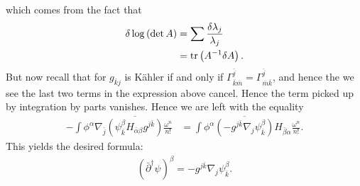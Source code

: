 \documentclass{../mathnotes}
\begin{document}
which comes from the fact that
\begin{align*}
    \delta\log\left( \det A \right)&=\sum\frac{\delta \lambda_j}{\lambda_j}\\
    &=\operatorname{tr}\left( A^{-1}\delta A \right).
\end{align*}
But now recall that for $g_{\bar kj}$ is K\"ahler if and only if $\Gamma^{\bar j}_{\bar k\bar m}=\Gamma^{\bar j}_{\bar m\bar k}$,
and hence the we see the last two terms in  the expression above cancel. Hence the term picked up by integration by parts vanishes.
Hence we are left with the equality
\begin{align*}
    -\int\phi^\alpha\nabla_{\bar j}\overline{\left( \psi^{\beta}_{\bar k}H_{\bar\alpha\beta}g^{j\bar k} \right)}\frac{\omega^n}{n!}&=
    \int\phi^\alpha\overline{\left( -g^{j\bar k}\nabla_j\psi^\beta_{\bar k} \right)}H_{\bar \beta\alpha}\frac{\omega^n}{n!}.
\end{align*}
This yields the desired formula:
\begin{align*}
    ( \bar\partial^\dagger\psi )^{\beta}=-g^{j\bar k}\nabla_j\psi^\beta_{\bar k}.
\end{align*}
\end{document}
